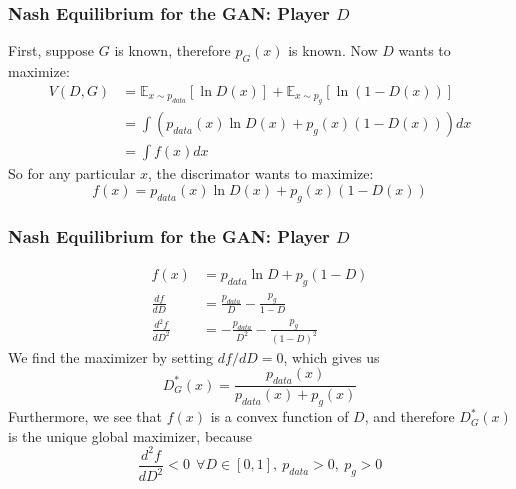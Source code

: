 \documentclass{beamer}
\begin{document}
\begin{frame}
  \frametitle{Nash Equilibrium for the GAN: Player $D$}

  First, suppose $G$ is known, therefore $p_G(x)$ is known.
  Now $D$ wants to maximize:
  \begin{align*}
    V(D,G) &= \mathbb{E}_{x\sim p_{data}}\left[\ln D(x)\right]
    +\mathbb{E}_{x\sim p_g}\left[\ln\left(1-D(x)\right)\right]\\
    &= \int \left(p_{data}(x)\ln D(x)+p_g(x)\left(1-D(x)\right)\right)dx\\
    &= \int f(x)dx
  \end{align*}
  So for any particular $x$, the discrimator wants to maximize:
  \begin{displaymath}
    f(x)=p_{data}(x)\ln D(x)+p_g(x)\left(1-D(x)\right)
  \end{displaymath}
\end{frame}
\begin{frame}
  \frametitle{Nash Equilibrium for the GAN: Player $D$}
  \begin{align*}
    f(x)&=p_{data}\ln D+p_g\left(1-D\right)\\
    \frac{df}{dD} &= \frac{p_{data}}{D} - \frac{p_g}{1-D}\\
    \frac{d^2f}{dD^2} &= -\frac{p_{data}}{D^2} - \frac{p_g}{(1-D)^2}
  \end{align*}
  We find the maximizer by setting $df/dD=0$, which gives us
  \begin{displaymath}
    D^*_G(x) = \frac{p_{data}(x)}{p_{data}(x)+p_g(x)}
  \end{displaymath}
  Furthermore, we see that $f(x)$ is a convex function of $D$, and
  therefore $D^*_G(x)$ is the unique global maximizer, because
  \begin{displaymath}
    \frac{d^2f}{dD^2} < 0~~\forall D\in [0,1],~p_{data}>0,~p_g>0
  \end{displaymath}
\end{frame}
\end{document}
